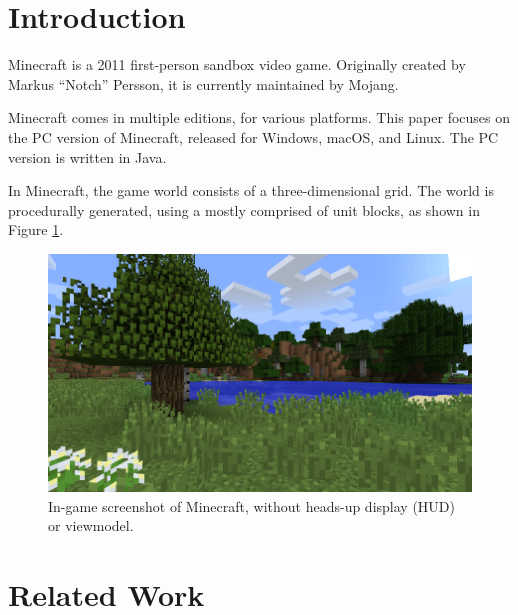 \documentclass[]{article}
\renewcommand{\listoffigures}{\begingroup
\tocsection
\tocfile{\listfigurename}{lof}
\endgroup}
\begin{document}

\newpage
\tableofcontents
\newpage
\listoffigures
\newpage

\section{Introduction}
Minecraft is a 2011 first-person sandbox video game.
Originally created by Markus \enquote{Notch} Persson, it is currently maintained by Mojang.


Minecraft comes in multiple editions, for various platforms. This paper focuses on the PC version of Minecraft, released for Windows, macOS, and Linux.
The PC version is written in Java.

In Minecraft, the game world consists of a three-dimensional grid.
The world is procedurally generated, using a 
mostly comprised of unit blocks, as shown in Figure \ref{fig:ss-worldgen}.

\begin{figure}
  \includegraphics[width=\textwidth]{ss-worldgen.png}
  \centering
  \caption{In-game screenshot of Minecraft, without heads-up display (HUD) or viewmodel.}
  \label{fig:ss-worldgen}
\end{figure}

\section{Related Work}
\end{document}
